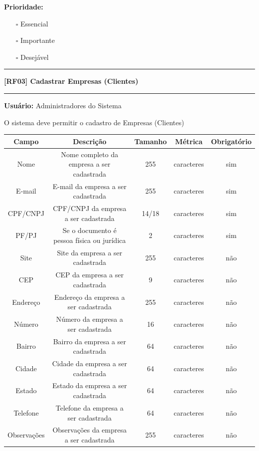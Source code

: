 	\textbf{Prioridade: }\begin{itemize}
		\item[\hspace{1cm}\rlap{\raisebox{0.2ex}{\hspace{0.4ex}\scriptsize \ding{56}}}$\square$]
		Essencial
		\item[\hspace{1cm}$\square$]
		Importante
		\item[\hspace{1cm}$\square$]
		Desejável
	\end{itemize}
	\begin{center}
		\noindent\rule{10cm}{0.4pt}
		\textbf{[RF03] Cadastrar Empresas (Clientes)}
		\noindent\rule{10cm}{0.4pt}
	\end{center}
	\textbf{Usuário:} Administradores do Sistema
	
	O sistema deve permitir o cadastro de Empresas (Clientes)
	
	\begin{center}
		\begin{adjustbox}{width=\textwidth}      \begin{tabular}{ |c|c|c|c|c| } 
				\hline
				\rowcolor{lightgray} Campo & Descrição & Tamanho & Métrica & Obrigatório \\
				\hline
				Nome & Nome completo da empresa a ser cadastrada & 255 & caracteres & sim \\ 
				\hline
				E-mail & E-mail da empresa a ser cadastrada & 255 & caracteres & sim \\ 
				\hline
				CPF/CNPJ & CPF/CNPJ da empresa a ser cadastrada & 14/18 & caracteres & sim \\ 
				\hline
				PF/PJ & Se o documento é pessoa física ou jurídica & 2 & caracteres & sim \\ 
				\hline
				Site & Site da empresa a ser cadastrada & 255 & caracteres & não \\ 
				\hline
				CEP & CEP da empresa a ser cadastrada & 9 & caracteres & não \\ 
				\hline
				Endereço & Endereço da empresa a ser cadastrada & 255 & caracteres & não \\ 
				\hline
				Número & Número da empresa a ser cadastrada & 16 & caracteres & não \\ 
				\hline
				Bairro & Bairro da empresa a ser cadastrada & 64 & caracteres & não \\ 
				\hline
				Cidade & Cidade da empresa a ser cadastrada & 64 & caracteres & não \\ 
				\hline
				Estado & Estado da empresa a ser cadastrada & 64 & caracteres & não \\ 
				\hline
				Telefone & Telefone da empresa a ser cadastrada & 64 & caracteres & não \\ 
				\hline
				Observações & Observações da empresa a ser cadastrada & 255 & caracteres & não \\
				\hline
		\end{tabular}    \end{adjustbox}
	\end{center}
	
